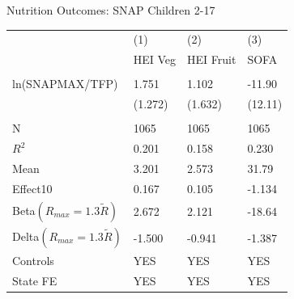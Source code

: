 \documentclass{beamer}
\begin{document}
\begin{frame}
\begin{table}{Nutrition Outcomes: SNAP Children 2-17}
\begin{adjustbox}{max width=\textwidth}
\begin{tabular}{llll}
\toprule
 & (1) & (2) & (3) \\
 & HEI Veg & HEI Fruit & SOFA \\
\midrule
 \\
ln(SNAPMAX/TFP) & 1.751 & 1.102 & -11.90 \\
 & (1.272) & (1.632) & (12.11) \\
 \\
N & 1065 & 1065 & 1065 \\
$R^2$ & 0.201 & 0.158 & 0.230 \\
Mean & 3.201 & 2.573 & 31.79 \\
Effect10 & 0.167 & 0.105 & -1.134 \\
Beta$(R_{max}=1.3\tilde{R})$ & 2.672 & 2.121 & -18.64 \\
Delta$(R_{max}=1.3\tilde{R})$ & -1.500 & -0.941 & -1.387 \\
Controls & YES & YES & YES \\
State FE & YES & YES & YES \\
\bottomrule
\end{tabular}
\end{adjustbox}
\end{table}
\end{frame}
\end{document}
